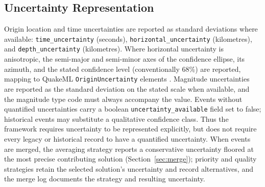 \documentclass[11pt]{article}
\begin{document}
\subsection{Uncertainty Representation}
Origin location and time uncertainties are reported as standard deviations where available: \texttt{time\_uncertainty} (seconds), \texttt{horizontal\_uncertainty} (kilometres), and \texttt{depth\_uncertainty} (kilometres). Where horizontal uncertainty is anisotropic, the semi-major and semi-minor axes of the confidence ellipse, its azimuth, and the stated confidence level (conventionally 68\%) are reported, mapping to QuakeML \texttt{OriginUncertainty} elements \citep{QuakeML}. Magnitude uncertainties are reported as the standard deviation on the stated scale when available, and the magnitude type code must always accompany the value. Events without quantified uncertainties carry a boolean \texttt{uncertainty\_available} field set to false; historical events may substitute a qualitative confidence class. Thus the framework requires uncertainty to be represented explicitly, but does not require every legacy or historical record to have a quantified uncertainty. When events are merged, the averaging strategy reports a conservative uncertainty floored at the most precise contributing solution (Section~\ref{sec:merge}); priority and quality strategies retain the selected solution's uncertainty and record alternatives, and the merge log documents the strategy and resulting uncertainty.
\end{document}
